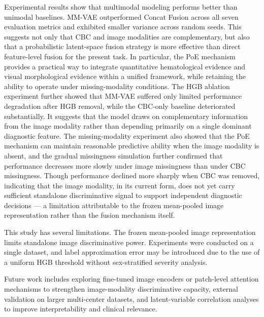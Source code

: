 \documentclass[conference]{IEEEtran}
\begin{document}
Experimental results show that multimodal modeling performs better than unimodal baselines. MM-VAE outperformed Concat Fusion across all seven evaluation metrics and exhibited smaller variance across random seeds. This suggests not only that CBC and image modalities are complementary, but also that a probabilistic latent-space fusion strategy is more effective than direct feature-level fusion for the present task. In particular, the PoE mechanism provides a practical way to integrate quantitative hematological evidence and visual morphological evidence within a unified framework, while retaining the ability to operate under missing-modality conditions. The HGB ablation experiment further showed that MM-VAE suffered only limited performance degradation after HGB removal, while the CBC-only baseline deteriorated substantially. It suggests that the model draws on complementary information from the image modality rather than depending primarily on a single dominant diagnostic feature. The missing-modality experiment also showed that the PoE mechanism can maintain reasonable predictive ability when the image modality is absent, and the gradual missingness simulation further confirmed that performance decreases more slowly under image missingness than under CBC missingness. Though performance declined more sharply when CBC was removed, indicating that the image modality, in its current form, does not yet carry sufficient standalone discriminative signal to support independent diagnostic decisions --- a limitation attributable to the frozen mean-pooled image representation rather than the fusion mechanism itself.

This study has several limitations. The frozen mean-pooled image representation limits standalone image discriminative power. Experiments were conducted on a single dataset, and label approximation error may be introduced due to the use of a uniform HGB threshold without sex-stratified severity analysis.

Future work includes exploring fine-tuned image encoders or patch-level attention mechanisms to strengthen image-modality discriminative capacity, external validation on larger multi-center datasets, and latent-variable correlation analyses to improve interpretability and clinical relevance.
\end{document}
